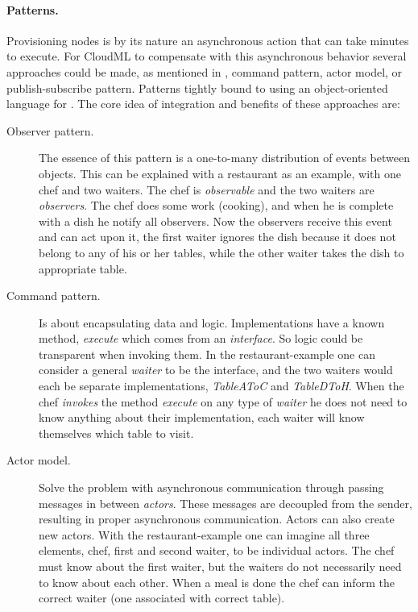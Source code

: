 \paragraph{Patterns.}

Provisioning nodes is by its nature an asynchronous action that can take minutes to execute.
For CloudML to compensate with this asynchronous behavior several approaches could be made,
as mentioned in , \eg command pattern, actor model,
or publish-subscribe pattern.
Patterns tightly bound to using an object-oriented language for .
The core idea of integration and benefits of these approaches are:
\begin{description}
  \item[Observer pattern.] The essence of this pattern is a one-to-many distribution of events between objects.
    This can be explained with a restaurant as an example, with one chef and two waiters.
    The chef is \emph{observable} and the two waiters are \emph{observers}.
    The chef does some work (cooking), and when he is complete with a dish he notify all observers.
    Now the observers receive this event and can act upon it, 
    \eg the first waiter ignores the dish because it does not belong to any of his or her tables, 
    while the other waiter takes the dish to appropriate table.
  \item[Command pattern.] Is about encapsulating data and logic. 
    Implementations have a known method, \eg \emph{execute} which comes from an \emph{interface}.
    So logic could be transparent when invoking them.
    In the restaurant-example one can consider a general \emph{waiter} to be the interface,
    and the two waiters would each be separate implementations, 
    \eg \emph{TableAToC} and \emph{TableDToH}.
    When the chef \emph{invokes} the method \emph{execute} on any type of \emph{waiter} he does not
    need to know anything about their implementation, each waiter will know themselves which table to visit.
  \item[Actor model.] Solve the problem with asynchronous communication through passing messages
    in between \emph{actors}.
    These messages are decoupled from the sender, resulting in proper asynchronous communication.
    Actors can also create new actors.
    With the restaurant-example one can imagine all three elements, \ie chef, first and second waiter,
    to be individual actors.
    The chef must know about the first waiter, 
    but the waiters do not necessarily need to know about each other.
    When a meal is done the chef can inform the correct waiter (one associated with correct table).

\end{description}

